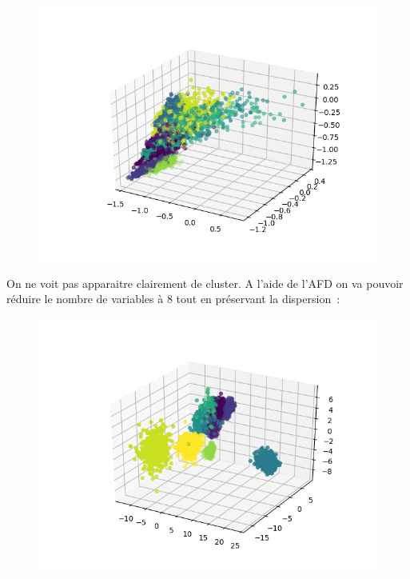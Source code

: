 \documentclass[12pt]{scrartcl} %
\begin{document}
\newline
\begin{figure}[!h]
 \centering 
\includegraphics[scale=.3]{init.png}
\end{figure}
\newline 

On ne voit pas apparaitre clairement de cluster. A l'aide de l'AFD on va pouvoir réduire le nombre de variables à 8 tout en préservant la dispersion~:
\newline
\begin{figure}[!h]
 \centering 
\includegraphics[scale=.3]{AFD8.png}
\end{figure}
\newline 
\end{document}
